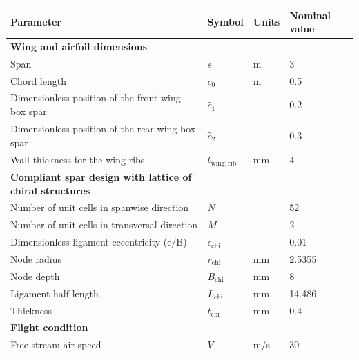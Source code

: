     \begin{table}[!htpb]
      \centering
      \begin{tabular}{|l|lll|}
      \hline
      \textbf{Parameter} & \multicolumn{1}{l|}{\textbf{Symbol}} & \multicolumn{1}{l|}{\textbf{Units}} & \textbf{Nominal value} \\ \hline \hline
      {\textbf{Wing and airfoil dimensions}} &  &  &  \\ \hline
      Span & \multicolumn{1}{l|}{$s$} & \multicolumn{1}{l|}{m} & 3 \\ \hline
      Chord length & \multicolumn{1}{l|}{$c_0$} & \multicolumn{1}{l|}{m} & 0.5 \\ \hline
      Dimensionless position of the front wing-box spar & \multicolumn{1}{l|}{$\hat{c}_1$} & \multicolumn{1}{l|}{} & 0.2 \\ \hline
      Dimensionless position of the rear wing-box spar & \multicolumn{1}{l|}{$\hat{c}_2$} & \multicolumn{1}{l|}{} & 0.3 \\ \hline
      Wall thickness for the wing ribs & \multicolumn{1}{l|}{$t_{\mathrm{wing,rib}}$} & \multicolumn{1}{l|}{mm} & 4 \\ \hline \hline
      {\textbf{Compliant spar design with lattice of chiral structures}} &  &  &  \\ \hline
      Number of unit cells in spanwise direction & \multicolumn{1}{l|}{$N$} & \multicolumn{1}{l|}{} & 52 \\ \hline
      Number of unit cells in transversal direction & \multicolumn{1}{l|}{$M$} & \multicolumn{1}{l|}{} & 2 \\ \hline
      Dimensionless ligament eccentricity (e/B) & \multicolumn{1}{l|}{$\epsilon_{\mathrm{chi}}$} & \multicolumn{1}{l|}{} & 0.01 \\ \hline
      Node radius & \multicolumn{1}{l|}{$r_{\mathrm{chi}}$} & \multicolumn{1}{l|}{mm} & 2.5355 \\ \hline
      Node depth & \multicolumn{1}{l|}{$B_{\mathrm{chi}}$} & \multicolumn{1}{l|}{mm} & 8 \\ \hline
      Ligament half length & \multicolumn{1}{l|}{$L_{\mathrm{chi}}$} & \multicolumn{1}{l|}{mm} & 14.486 \\ \hline
      Thickness & \multicolumn{1}{l|}{$t_{\mathrm{chi}}$} & \multicolumn{1}{l|}{mm} & 0.4 \\ \hline \hline
      {\textbf{Flight condition}} &  &  &  \\ \hline
      Free-stream air speed & \multicolumn{1}{l|}{$V$} & \multicolumn{1}{l|}{m/s} & 30 \\ \hline

\end{tabular}
\end{table}
